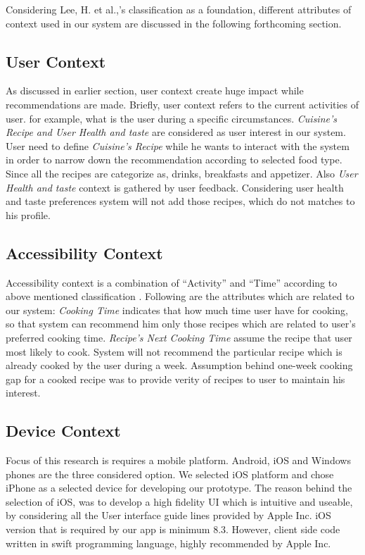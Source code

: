 Considering Lee, H. et al.,’s classification\cite{lee2005context} as a foundation, different attributes of  context used in our system are discussed in the following forthcoming section.

\subsection{User Context}

As discussed in earlier section, user context create huge impact while recommendations are made.  Briefly, user context refers to the current activities of user. for example, what is the user during a specific circumstances. \textit{Cuisine’s Recipe and User Health and taste} are considered as  user interest in our system. User need to define \textit{ Cuisine’s Recipe} while he wants to interact with the system in order to narrow down the recommendation  according to selected food type. Since all the recipes are categorize as, drinks, breakfasts and appetizer.  Also \textit{User Health and taste}  context is gathered by user feedback. Considering user health and taste preferences system will not add those recipes, which do not matches to his profile. 
	
\subsection{Accessibility Context}
	
Accessibility context is a combination of “Activity” and “Time” according to above mentioned classification \cite{lee2005context}.  Following are the attributes which are related to our system: \textit{Cooking Time} indicates that how much time user have for cooking, so that system can recommend him only those recipes which are related to user’s preferred cooking time. \textit{Recipe’s Next Cooking Time} assume the recipe that user most likely to cook. System will not recommend the particular recipe which is already cooked by the user during a week. Assumption behind one-week cooking gap for a cooked recipe was to provide verity of recipes to user to maintain his interest. 
	
\subsection{Device Context}
	
Focus of this research is requires a mobile platform. Android, iOS and Windows phones are the three considered option. We selected iOS platform and chose iPhone as a selected device for developing our prototype. The reason behind the selection of iOS, was to develop a high fidelity UI which is intuitive and useable, by considering all the User interface guide lines provided by Apple Inc. iOS version that is required by our app is minimum 8.3. However, client side code written in swift programming language, highly recommended by Apple Inc.

